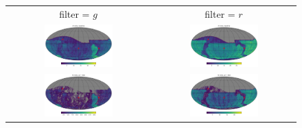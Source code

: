 \documentclass[preprintm,linenumbers]{aastex631}
\begin{document}
\begin{figure}
   		\centering
			\begin{tabular}{c c}
          filter = $g$ &  filter = $r$\\
   		\includegraphics[width=0.5\textwidth]{results/skymaps_cutout/skymaps_cutout_first_year_one_snap_v4_0_10yrs_db_noDD_noTwi_nside-256_CountMetric_g_noDD_noTwi.pdf} &
   		\includegraphics[width=0.5\textwidth]{results/skymaps_cutout/skymaps_cutout_first_year_one_snap_v4_0_10yrs_db_noDD_noTwi_nside-256_CountMetric_r_noDD_noTwi.pdf} \\

         \includegraphics[width=0.5\textwidth]{results/skymaps_cutout/skymaps_cutout_first_year_one_snap_v4_0_10yrs_db_noDD_noTwi_tscale-28_nside-256_doAllTemplateMetrics_reduceCount_g_noDD_noTwi.pdf} &
         \includegraphics[width=0.5\textwidth]{results/skymaps_cutout/skymaps_cutout_first_year_one_snap_v4_0_10yrs_db_noDD_noTwi_tscale-28_nside-256_doAllTemplateMetrics_reduceCount_r_noDD_noTwi.pdf} \\


\end{tabular}
\end{figure}
\end{document}
